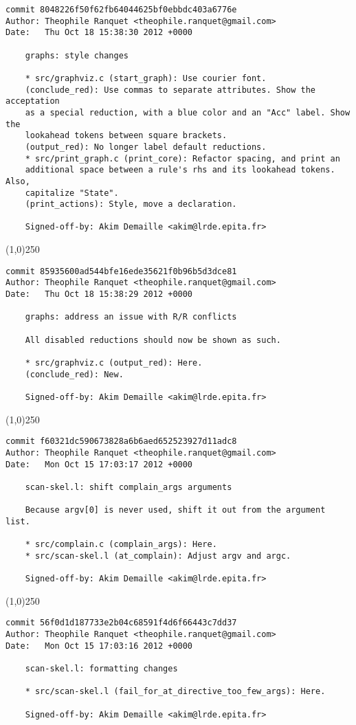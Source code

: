 \begin{verbatim}
commit 8048226f50f62fb64044625bf0ebbdc403a6776e
Author: Theophile Ranquet <theophile.ranquet@gmail.com>
Date:   Thu Oct 18 15:38:30 2012 +0000

    graphs: style changes
    
    * src/graphviz.c (start_graph): Use courier font.
    (conclude_red): Use commas to separate attributes. Show the acceptation
    as a special reduction, with a blue color and an "Acc" label. Show the
    lookahead tokens between square brackets.
    (output_red): No longer label default reductions.
    * src/print_graph.c (print_core): Refactor spacing, and print an
    additional space between a rule's rhs and its lookahead tokens. Also,
    capitalize "State".
    (print_actions): Style, move a declaration.
    
    Signed-off-by: Akim Demaille <akim@lrde.epita.fr>

\end{verbatim}
\line(1,0){250}
\begin{verbatim}
commit 85935600ad544bfe16ede35621f0b96b5d3dce81
Author: Theophile Ranquet <theophile.ranquet@gmail.com>
Date:   Thu Oct 18 15:38:29 2012 +0000

    graphs: address an issue with R/R conflicts
    
    All disabled reductions should now be shown as such.
    
    * src/graphviz.c (output_red): Here.
    (conclude_red): New.
    
    Signed-off-by: Akim Demaille <akim@lrde.epita.fr>

\end{verbatim}
\line(1,0){250}
\begin{verbatim}
commit f60321dc590673828a6b6aed652523927d11adc8
Author: Theophile Ranquet <theophile.ranquet@gmail.com>
Date:   Mon Oct 15 17:03:17 2012 +0000

    scan-skel.l: shift complain_args arguments
    
    Because argv[0] is never used, shift it out from the argument list.
    
    * src/complain.c (complain_args): Here.
    * src/scan-skel.l (at_complain): Adjust argv and argc.
    
    Signed-off-by: Akim Demaille <akim@lrde.epita.fr>

\end{verbatim}
\line(1,0){250}
\begin{verbatim}
commit 56f0d1d187733e2b04c68591f4d6f66443c7dd37
Author: Theophile Ranquet <theophile.ranquet@gmail.com>
Date:   Mon Oct 15 17:03:16 2012 +0000

    scan-skel.l: formatting changes
    
    * src/scan-skel.l (fail_for_at_directive_too_few_args): Here.
    
    Signed-off-by: Akim Demaille <akim@lrde.epita.fr>

\end{verbatim}
